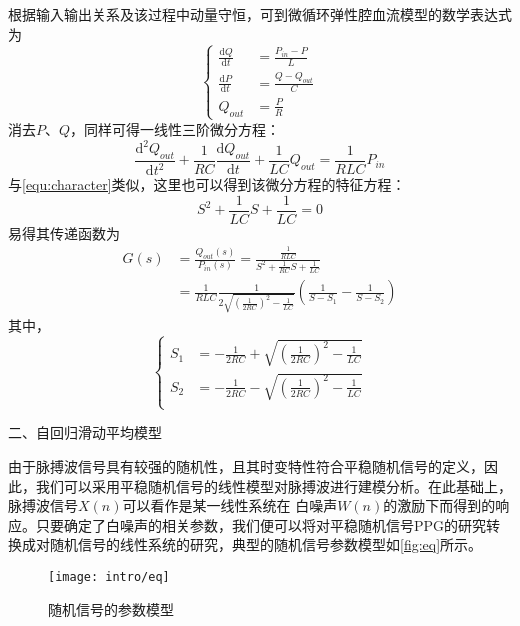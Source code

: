根据输入输出关系及该过程中动量守恒，可到微循环弹性腔血流模型的数学表达式为
\begin{equation}
    \label{equ:wxh1}
    \left \{
    \begin{aligned}
        \frac{\mathrm{d} Q}{\mathrm{d} t} &=\frac{P_{in}-P}{L}\\
        \frac{\mathrm{d} P}{\mathrm{d} t} &=\frac{Q-Q_{out}}{C}\\
        Q_{out} &=\frac{P}{R}
    \end{aligned}
    \right.
\end{equation}
消去$P$、$Q$，同样可得一线性三阶微分方程：
\begin{equation}
    \label{equ:wxh2}
    \frac{\mathrm{d^2} Q_{out}}{\mathrm{d} t^2}+\frac{1}{RC}\frac{\mathrm{d} Q_{out}}{\mathrm{d} t}+\frac{1}{LC}Q_{out}=\frac{1}{RLC}P_{in}
\end{equation}
与\autoref{equ:character}类似，这里也可以得到该微分方程的特征方程：
\begin{equation}
    \label{equ:character2}
    S^2+\frac{1}{LC}S+\frac{1}{LC}=0
\end{equation}
易得其传递函数为
\begin{equation}
    \label{equ:hs}
    \begin{aligned}
    G(s) &=\frac{Q_{out}(s)}{P_{in}(s)}=\frac{\frac{1}{RLC}}{S^2+\frac{1}{RC}S+\frac{1}{LC}} \\
    &=\frac{1}{RLC}\frac{1}{2\sqrt{(\frac{1}{2RC})^2-\frac{1}{LC}}}(\frac{1}{S-S_{1}}-\frac{1}{S-S_{2}})
    \end{aligned}
\end{equation}
其中，
\begin{equation}
    \label{equ:ss}
    \left \{
    \begin{aligned}
        S_{1} &= -\frac{1}{2RC}+\sqrt{(\frac{1}{2RC})^2-\frac{1}{LC}}\\
        S_{2} &= -\frac{1}{2RC}-\sqrt{(\frac{1}{2RC})^2-\frac{1}{LC}}\\
    \end{aligned}
    \right.
\end{equation}

二、自回归滑动平均模型

由于脉搏波信号具有较强的随机性，且其时变特性符合平稳随机信号的定义，因此，我们可以采用平稳随机信号的线性模型对脉搏波进行建模分析\cite{Qiu2012,PPGYY,Ma2015}。在此基础上，脉搏波信号$X(n)$可以看作是某一线性系统在
白噪声$W(n)$的激励下而得到的响应。只要确定了白噪声的相关参数，我们便可以将对平稳随机信号PPG的研究转换成对随机信号的线性系统的研究，典型的随机信号参数模型如\autoref{fig:eq}所示。
\begin{figure}[htbp]
    \centering
    \texttt{[image: intro/eq]}
    \caption{\label{fig:eq}随机信号的参数模型}
\end{figure}

